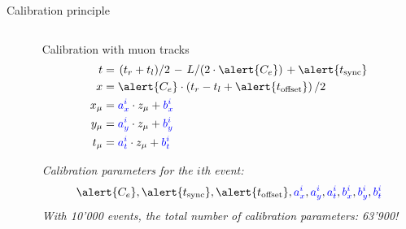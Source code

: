 \documentclass[compress, 13pt, aspectratio=169]{beamer}
\newcommand{\slfrac}[2]{\left.#1\middle/#2\right.}
\begin{document}
\begin{frame}[fragile,t]{Calibration principle}
\begin{columns}[t]
\begin{column}{0.45 \textwidth}
{			}
		\end{column}
		\pause
		\begin{column}{0.48 \textwidth}
			\begin{block}{Calibration with muon tracks}
				\vspace*{-1.5em}
				\begin{align}
					\small
					t     & = \slfrac{(t_r + t_l)}{2} - \slfrac{L}{(2 \cdot \alert{C_e})} + \alert{t_\text{sync}} \\
					x     & = \alert{C_e}\cdot \left( t_r - t_l  + \alert{t_\text{offset}} \right) / 2            \\
					x_\mu & = \textcolor{blue}{a^i_x} \cdot z_\mu  + \textcolor{blue}{b^i_x}                      \\
					y_\mu & = \textcolor{blue}{a^i_y} \cdot z_\mu  + \textcolor{blue}{b^i_y}                      \\
					t_\mu & = \textcolor{blue}{a^i_t} \cdot z_\mu  + \textcolor{blue}{b^i_t}
				\end{align}
			\end{block}
			\textit{Calibration parameters for the $i$th event:}
			$$\alert{C_e}, \alert{t_\text{sync}}, \alert{t_\text{offset}}, \textcolor{blue}{a^i_x}, \textcolor{blue}{a^i_y}, \textcolor{blue}{a^i_t}, \textcolor{blue}{b^i_x}, \textcolor{blue}{b^i_y}, \textcolor{blue}{b^i_t}$$
			\pause
			\vspace*{1em}
			\textit{With 10'000 events, the total number of calibration parameters: \alert{\huge 63'900!}}
		\end{column}

	\end{columns}
\end{frame}
\end{document}
